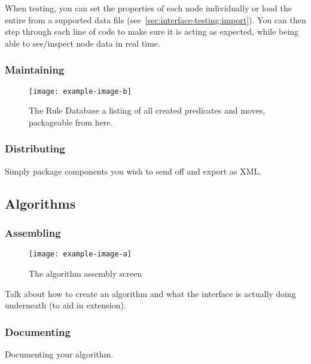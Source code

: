 When testing, you can set the properties of each node individually
  or load the entire from a supported data file (see~\autoref{sec:interface-testing:import}).
You can then step through each line of code to make sure it is acting as expected,
  while being able to see\slash inspect node data in real time.

\subsubsection{Maintaining}
\begin{figure}
  \centering
  \texttt{[image: example-image-b]}
  \caption{The Rule Database \Dash
    a listing of all created predicates and moves,
    packageable from here.}
  \label{fig:iface:ruledb}
\end{figure}
\subsubsection{Distributing}
\begin{draftvspace}{1in}
  Simply package components you wish to send off and export as XML.
\end{draftvspace}

\subsection{Algorithms}

\subsubsection{Assembling}
\begin{figure}
  \centering
  \texttt{[image: example-image-a]}
  \caption{The algorithm assembly screen}
  \label{fig:iface:alg-asm}
\end{figure}
\begin{draftvspace}{3in}
  Talk about how to create an algorithm and
    what the interface is actually doing underneath
    (to aid in extension).
\end{draftvspace}
\subsubsection{Documenting}
\begin{draftvspace}{2in}
  Documenting your algorithm.
\end{draftvspace}
